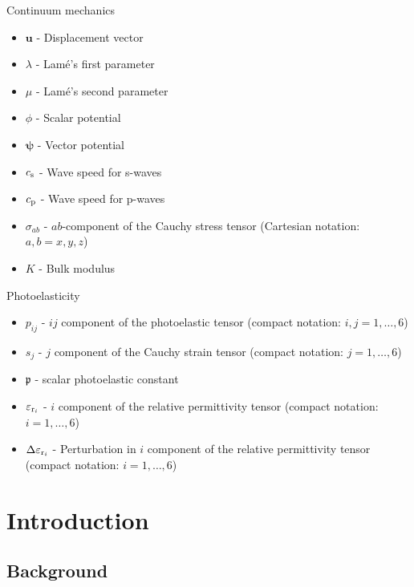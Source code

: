 \documentclass[11pt,twoside]{eitExjobb}
\begin{document}
		Continuum mechanics
		\begin{itemize}
			\item $\bm{u}$ - Displacement vector
			\item $\lambda$ - Lamé's first parameter
			\item $\mu$ - Lamé's second parameter
			\item $\phi$ - Scalar potential
			\item $\bm{\psi}$ - Vector potential
			\item $c_{\mathrm{s}}$ - Wave speed for s-waves
			\item $c_{\mathrm{p}}$ - Wave speed for p-waves
			\item $\sigma_{ab}$ - $ab$-component of the Cauchy stress tensor (Cartesian notation: $a,b = x,y,z$)
			\item $K$ - Bulk modulus
		\end{itemize}
		Photoelasticity
		\begin{itemize}
			\item $p_{ij}$ - $ij$ component of the photoelastic tensor (compact notation: $i,j = 1,\dotsc,6$)
			\item $s_j$ - $j$ component of the Cauchy strain tensor (compact notation: $j = 1,\dotsc,6$)
			\item $\mathfrak{p}$ - scalar photoelastic constant
			\item $\varepsilon_{\mathrm{r}_i}$ - $i$ component of the relative permittivity tensor (compact notation: $i = 1,\dotsc,6$)
			\item $\Delta \varepsilon_{\mathrm{r}_i}$ - Perturbation in $i$ component of the relative permittivity tensor (compact notation: $i = 1,\dotsc,6$)
		\end{itemize}
	
	\cleardoublepage
	
	\mainmatter		%
	
	\chapter{Introduction \label{ch:intro}}
	
	\section{Background}
	
\end{document}

